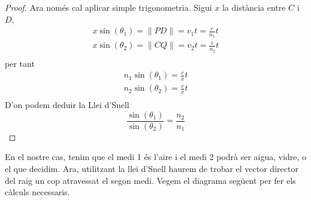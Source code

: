 \documentclass{article}
\begin{document}
\begin{proof}
Ara només cal aplicar simple trigonometria. Sigui $x$ la distància entre  $C$ i  $D$,
 \begin{align*}
    x \sin(\theta_1) = \|PD\| = v_1t= \frac{c}{n_1} t  \\
    x \sin(\theta_2) = \|CQ\| = v_2t= \frac{c}{n_2} t  \\
\end{align*}
per tant 
\begin{align*}
   n_1 \sin(\theta_1) = \frac{c}{x}t \\
   n_2 \sin(\theta_2) = \frac{c}{x}t \\
\end{align*}
D'on podem deduir la Llei d'Snell
  \begin{equation*}
     \frac{\sin(\theta_1)}{\sin(\theta_2)}= \frac{n_2}{n_1}
  \end{equation*} 
\end{proof}


En el nostre cas, tenim que el medi 1 és l'aire i el medi 2 podrà ser aigua, vidre, o el que decidim.
Ara, utilitzant la llei d'Snell haurem de trobar el vector director del raig un cop atravessat el segon medi. Vegem el diagrama
següent per fer els càlculs necessaris.
\end{document}
